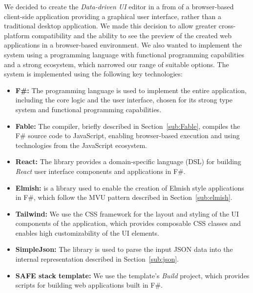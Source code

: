 We decided to create the \emph{Data-driven UI} editor in a from of a browser-based client-side application providing a graphical user interface, rather than a traditional desktop application.
We made this decision to allow greater cross-platform compatibility and the ability to see the preview of the created web applications in a browser-based environment.
We also wanted to implement the system using a programming language with functional programming capabilities and a strong ecosystem, which narrowed our range of suitable options.
The system is implemented using the following key technologies:
\begin{itemize}
	\item \textbf{F\#:} The \citet{fsharp} programming language is used to implement the entire application, including the core logic and the user interface, chosen for its strong type system and functional programming capabilities.
	\item \textbf{Fable:} The \citet{fable} compiler, briefly described in Section~\ref{sub:Fable}, compiles the F\# source code to JavaScript, enabling browser-based execution and using technologies from the JavaScript ecosystem.
	\item \textbf{React:} The \citet{feliz} library provides a domain-specific language (DSL) for building \emph{React} user interface components and applications in F\#.
	\item \textbf{Elmish:} \citet{elmish} is a library used to enable the creation of Elmish style applications in F\#, which follow the MVU pattern described in Section~\ref{sub:elmish}.
	\item \textbf{Tailwind:} We use the \citet{tailwind} CSS framework for the layout and styling of the UI components of the application, which provides composable CSS classes and enables high customizability of the UI elements.
	\item \textbf{SimpleJson:} The \citet{simpleJson} library is used to parse the input JSON data into the internal representation described in Section~\ref{sub:json}.
  \item \textbf{SAFE stack template:} We use the \citet{safestack} template's \emph{Build} project, which provides scripts for building web applications built in F\#. 
\end{itemize}


